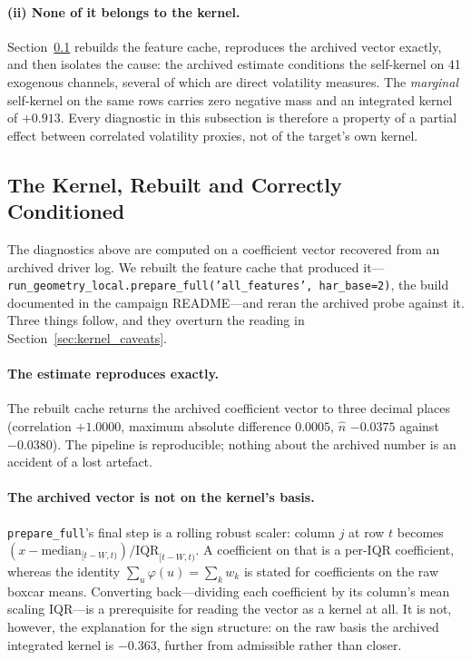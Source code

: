 \paragraph{(ii) None of it belongs to the kernel.}
Section~\ref{sec:kernel_repro} rebuilds the feature cache, reproduces the
archived vector exactly, and then isolates the cause: the archived estimate
conditions the self-kernel on 41 exogenous channels, several of which are
direct volatility measures. The \emph{marginal} self-kernel on the same rows
carries zero negative mass and an integrated kernel of $+0.913$. Every
diagnostic in this subsection is therefore a property of a partial effect
between correlated volatility proxies, not of the target's own kernel.

\subsection{The Kernel, Rebuilt and Correctly Conditioned}
\label{sec:kernel_repro}

The diagnostics above are computed on a coefficient vector recovered from an
archived driver log. We rebuilt the feature cache that produced it---
\texttt{run\_geometry\_local.prepare\_full('all\_features', har\_base=2)}, the
build documented in the campaign README---and reran the archived probe against
it. Three things follow, and they overturn the reading in
Section~\ref{sec:kernel_caveats}.

\paragraph{The estimate reproduces exactly.} The rebuilt cache returns the
archived coefficient vector to three decimal places (correlation $+1.0000$,
maximum absolute difference $0.0005$, $\hat n$ $-0.0375$ against $-0.0380$).
The pipeline is reproducible; nothing about the archived number is an accident
of a lost artefact.

\paragraph{The archived vector is not on the kernel's basis.}
\texttt{prepare\_full}'s final step is a rolling robust scaler: column $j$ at
row $t$ becomes $(x - \mathrm{median}_{[t-W,t)}) / \mathrm{IQR}_{[t-W,t)}$. A
coefficient on that is a per-IQR coefficient, whereas the identity
$\sum_u \varphi(u) = \sum_k w_k$ is stated for coefficients on the raw boxcar
means. Converting back---dividing each coefficient by its column's mean scaling
IQR---is a prerequisite for reading the vector as a kernel at all. It is not,
however, the explanation for the sign structure: on the raw basis the archived
integrated kernel is $-0.363$, further from admissible rather than closer.

